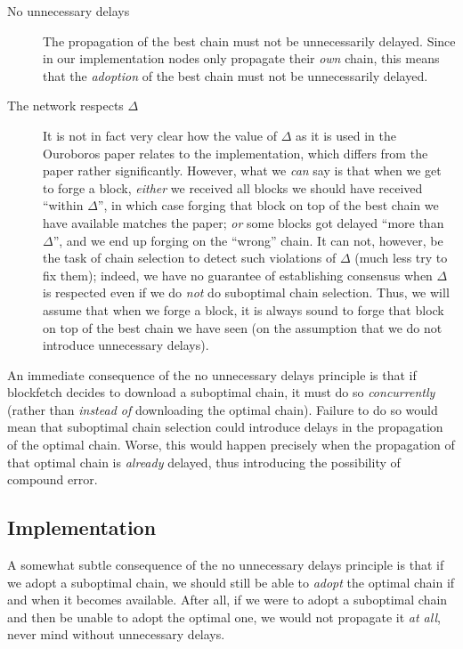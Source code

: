 \begin{description}
\item[No unnecessary delays]
The propagation of the best chain must not be unnecessarily delayed. Since in
our implementation nodes only propagate their \emph{own} chain, this means that
the \emph{adoption} of the best chain must not be unnecessarily delayed.

\item[The network respects $\Delta$]
It is not in fact very clear how the value of $\Delta$ as it is used in the
Ouroboros paper relates to the implementation, which differs from the paper
rather significantly. However, what we \emph{can} say is that when we get to
forge a block, \emph{either} we received all blocks we should have received
``within $\Delta$'', in which case forging that block on top of the best chain
we have available matches the paper; \emph{or} some blocks got delayed ``more
than $\Delta$'', and we end up forging on the ``wrong'' chain. It can not,
however, be the task of chain selection to detect such violations of $\Delta$
(much less try to fix them); indeed, we have no guarantee of establishing
consensus when $\Delta$ is respected even if we do \emph{not} do suboptimal
chain selection. Thus, we will assume that when we forge a block, it is always
sound to forge that block on top of the best chain we have seen (on the
assumption that we do not introduce unnecessary delays).

\end{description}

An immediate consequence of the no unnecessary delays principle is that if
blockfetch decides to download a suboptimal chain, it must do so
\emph{concurrently} (rather than \emph{instead of} downloading the optimal
chain). Failure to do so would mean that suboptimal chain selection could
introduce delays in the propagation of the optimal chain. Worse, this would
happen precisely when the propagation of that optimal chain is \emph{already}
delayed, thus introducing the possibility of compound error.

\subsection{Implementation}

A somewhat subtle consequence of the no unnecessary delays principle is that if
we adopt a suboptimal chain, we should still be able to \emph{adopt} the optimal
chain if and when it becomes available. After all, if we were to adopt a
suboptimal chain and then be unable to adopt the optimal one, we would not
propagate it \emph{at all}, never mind without unnecessary delays.

